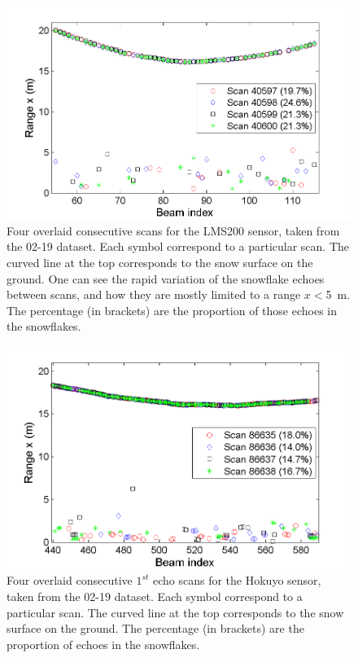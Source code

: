 \begin{figure}[th]
    \centering
    \includegraphics[width=0.95\linewidth]{./img/LMS200_4Scans_Feb19.png}
    \caption{Four overlaid consecutive scans for the LMS200 sensor, taken from the 02-19 dataset. Each symbol correspond to a particular scan. The curved line at the top corresponds to the snow surface on the ground. One can see the rapid variation of the snowflake echoes between scans, and how they are mostly limited to a range $x<$\SI{5}{\meter}. The percentage (in brackets) are the proportion of those echoes in the snowflakes.}
    \label{fig:LMS200_4Scans_Feb19}
\end{figure}

\begin{figure}[th]
    \centering
    \includegraphics[width=0.93\linewidth]{./img/Hokuyo_4Scans_Feb19.png}
    \caption{Four overlaid consecutive $1^{st}$ echo scans for the Hokuyo sensor, taken from the 02-19 dataset. Each symbol correspond to a particular scan. The curved line at the top corresponds to the snow surface on the ground. The percentage (in brackets) are the proportion of echoes in the snowflakes.}
    \label{fig:Hokuyo_4Scans_Feb19}
\end{figure}



